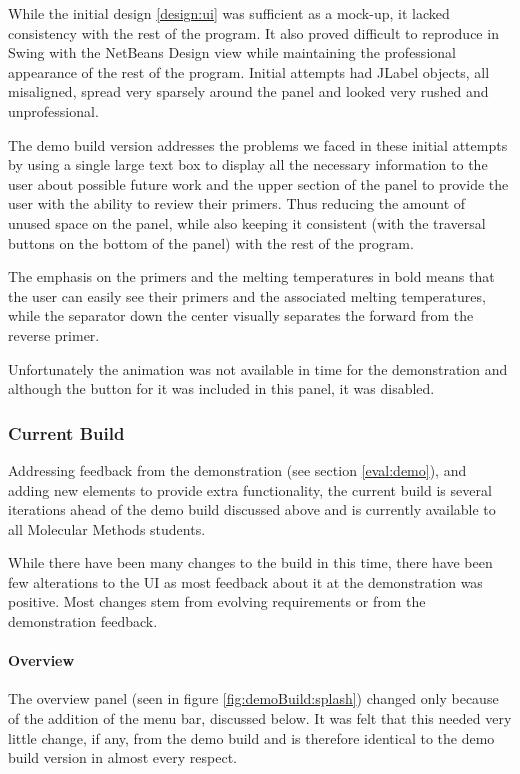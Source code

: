 While the initial design \ref{design:ui} was sufficient as a mock-up,
it lacked consistency with the rest of the program.
It also proved difficult to reproduce in Swing with the NetBeans
Design view while maintaining the professional appearance of the rest
of the program.
Initial attempts had JLabel objects, all misaligned, spread very
sparsely around the panel and looked very rushed and unprofessional.

The demo build version addresses the problems we faced in these initial
attempts by using a single large text box to display all the necessary
information to the user about possible future work and the upper
section of the panel to provide the user with the ability to review
their primers. 
Thus reducing the amount of unused space on the panel,
while also keeping it consistent (with the traversal buttons on the
bottom of the panel) with the rest of the program.

The emphasis on the primers and the melting temperatures in bold means
that the user can easily see their primers and the associated melting
temperatures, while the separator down the center visually separates
the forward from the reverse primer.

Unfortunately the animation was not available in time for the
demonstration and although the button for it was included in this
panel, it was disabled.


\subsubsection{Current Build}

Addressing feedback from the demonstration (see section \ref{eval:demo}),
and adding new elements to provide extra functionality, the current
build is several iterations ahead of the demo build discussed above
and is currently available to all Molecular Methods students.

While there have been many changes to the build in this time, there
have been few alterations to the UI as most feedback about it at the
demonstration was positive.
Most changes stem from evolving requirements or from the
demonstration feedback.

\paragraph{Overview}
The overview panel (seen in figure \ref{fig:demoBuild:splash})
changed only because of the addition of the menu bar, discussed
below.
It was felt that this needed very little change, if any, from the demo
build and is therefore identical to the demo build version in almost
every respect.


